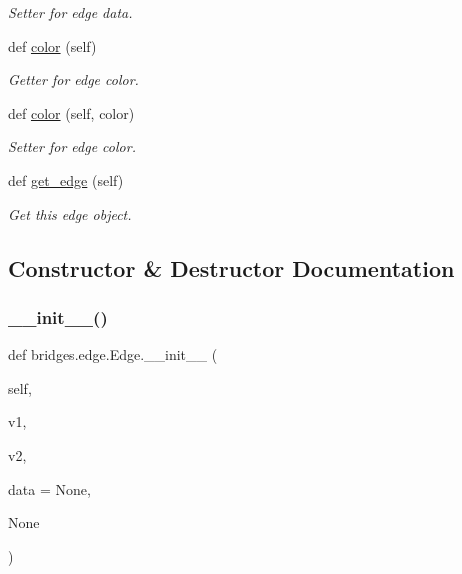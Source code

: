 \begin{DoxyCompactItemize}
\begin{DoxyCompactList}\small\item\em Setter for edge data. \end{DoxyCompactList}\item 
def \mbox{\hyperlink{classbridges_1_1edge_1_1_edge_a24a4845aeae4ca6fc432b6d0b7fa78c2}{color}} (self)
\begin{DoxyCompactList}\small\item\em Getter for edge color. \end{DoxyCompactList}\item 
def \mbox{\hyperlink{classbridges_1_1edge_1_1_edge_a81ccb5ffd5838829e1a2217846c4df77}{color}} (self, color)
\begin{DoxyCompactList}\small\item\em Setter for edge color. \end{DoxyCompactList}\item 
def \mbox{\hyperlink{classbridges_1_1edge_1_1_edge_a406b906ea8e177a6e54f6c794c04df3d}{get\+\_\+edge}} (self)
\begin{DoxyCompactList}\small\item\em Get this edge object. \end{DoxyCompactList}\end{DoxyCompactItemize}


\subsection{Constructor \& Destructor Documentation}
\mbox{\label{classbridges_1_1edge_1_1_edge_a3c5cbf52efec4e42a242bbcee7bc8051}} 
\subsubsection{\texorpdfstring{\+\_\+\+\_\+init\+\_\+\+\_\+()}{\_\_init\_\_()}}
{\footnotesize\ttfamily def bridges.\+edge.\+Edge.\+\_\+\+\_\+init\+\_\+\+\_\+ (\begin{DoxyParamCaption}\item[{}]{self,  }\item[{}]{v1,  }\item[{}]{v2,  }\item[{}]{data = {\ttfamily None},  }\item[{}]{None }\end{DoxyParamCaption})}



